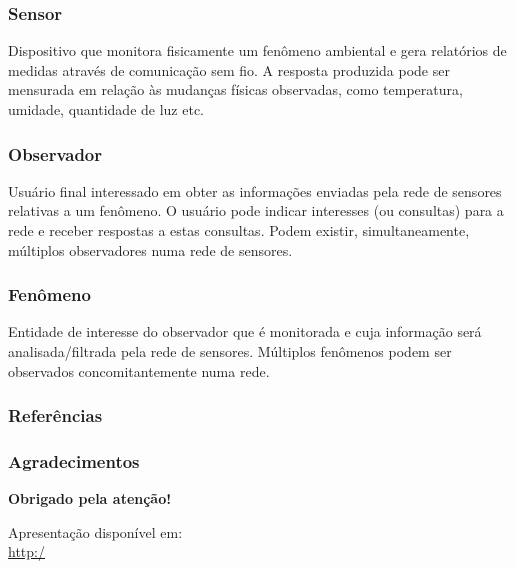 \documentclass[notes]{beamer}
\begin{document}
\begin{frame}

\frametitle{Sensor}

Dispositivo que monitora fisicamente um fenômeno ambiental e gera
relatórios de medidas através de comunicação sem
fio. A resposta produzida pode ser mensurada em relação às mudanças físicas observadas, como temperatura, umidade, quantidade de luz etc.

\end{frame}

\begin{frame}

\frametitle{Observador}

Usuário final interessado em obter
as informações enviadas pela rede de sensores relativas a um fenômeno. O usuário pode indicar interesses (ou consultas) para a rede e receber respostas a estas
consultas. Podem existir, simultaneamente,
múltiplos observadores numa rede de sensores.

\end{frame}

\begin{frame}

\frametitle{Fenômeno}

Entidade de interesse do observador que é monitorada e cuja
informação será analisada/filtrada pela rede de sensores. Múltiplos fenômenos
podem ser observados concomitantemente numa rede.

\end{frame}

\begin{frame}

\frametitle{Referências}




\end{frame}

\begin{frame}
\frametitle{Agradecimentos}
\vskip20pt

\begin{center}
{\bf \color{alert} Obrigado pela atenção!}
\end{center}

\vskip20pt

\begin{center}
Apresentação disponível em:\\
\url{http:/}
\vskip12pt
\end{center}

\titlepage
\end{frame}
\end{document}
